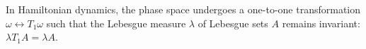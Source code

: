 In Hamiltonian dynamics, the phase space undergoes a one-to-one transformation $\omega \leftrightarrow T_1\omega$ such that the Lebesgue measure $\lambda$ of Lebesgue sets $A$ remains invariant: $\lambda T_1A = \lambda A$.
